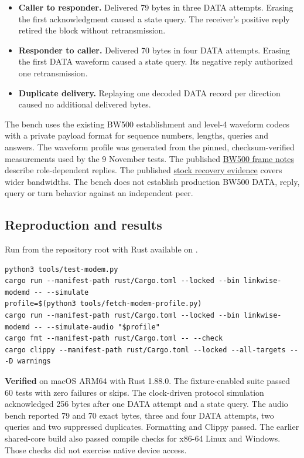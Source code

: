 \documentclass[11pt,a4paper]{article}
\newcommand{\statusverified}{\textcolor{verified}{\textbf{Verified}}}
\newcommand{\pathtext}[1]{\path{#1}}
\begin{document}
\begin{itemize}[leftmargin=*]
  \item \textbf{Caller to responder.} Delivered 79 bytes in three DATA
        attempts. Erasing the first acknowledgment caused a state query.
        The receiver's positive reply retired the block without retransmission.
  \item \textbf{Responder to caller.} Delivered 70 bytes in four DATA
        attempts. Erasing the first DATA waveform caused a state query.
        Its negative reply authorized one retransmission.
  \item \textbf{Duplicate delivery.} Replaying one decoded DATA record per
        direction caused no additional delivered bytes.
\end{itemize}

The bench uses the existing BW500 establishment and level-4 waveform codecs
with a private payload format for sequence numbers, lengths, queries and
answers. The waveform profile was generated from the pinned, checksum-verified
measurements used by the 9 November tests. The published
\href{https://github.com/sstjohn/hfmodem/blob/952f79245240132f4af209afbad1f4b2ba256613/docs/protocols/vara/04-frame-block-formats.md}{BW500 frame notes}
describe role-dependent replies. The published
\href{https://github.com/sstjohn/hfmodem/blob/952f79245240132f4af209afbad1f4b2ba256613/docs/protocols/vara/21-data-answer-recovery.md}{stock recovery evidence}
covers wider bandwidths. The bench does not establish production BW500 DATA,
reply, query or turn behavior against an independent peer.

\subsection{Reproduction and results}

Run from the repository root with Rust available on \pathtext{PATH}.

\begin{lstlisting}
python3 tools/test-modem.py
cargo run --manifest-path rust/Cargo.toml --locked --bin linkwise-modemd -- --simulate
profile=$(python3 tools/fetch-modem-profile.py)
cargo run --manifest-path rust/Cargo.toml --locked --bin linkwise-modemd -- --simulate-audio "$profile"
cargo fmt --manifest-path rust/Cargo.toml -- --check
cargo clippy --manifest-path rust/Cargo.toml --locked --all-targets -- -D warnings
\end{lstlisting}

\statusverified{} on macOS ARM64 with Rust 1.88.0. The fixture-enabled suite
passed 60 tests with zero failures or skips. The clock-driven protocol
simulation acknowledged 256 bytes after one DATA attempt and a state query.
The audio bench reported 79 and 70 exact bytes, three and four DATA attempts,
two queries and two suppressed duplicates. Formatting and Clippy passed.
The earlier shared-core build also passed compile checks for x86-64 Linux and
Windows. Those checks did not exercise native device access.
\end{document}
